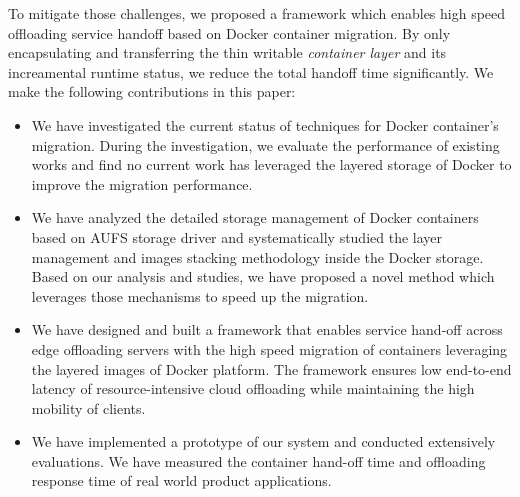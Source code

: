 %
To mitigate those challenges, we proposed a framework which enables high speed offloading service handoff based on Docker container migration. By only encapsulating and transferring the thin writable \textit{container layer} and its increamental runtime status, we reduce the total handoff time significantly.
We make the following contributions in this paper:
\begin{itemize}
    
    \item We have investigated the current status of techniques for Docker container's migration. 
    During the investigation, we evaluate the performance of existing works and find no current work has leveraged the layered storage of Docker to improve the migration performance.
     
    \item  We have analyzed the detailed storage management of Docker containers based on AUFS storage driver and systematically studied the layer management and images stacking methodology inside the Docker storage. Based on our analysis and studies, we have proposed a novel method which leverages those mechanisms to speed up the migration.
    
 
     \item We have designed and built a framework that enables service hand-off across edge offloading servers with the high speed migration of containers leveraging the layered images of Docker platform. The framework ensures low end-to-end latency of resource-intensive cloud offloading while maintaining the high mobility of clients. 
     
    \item We have implemented a prototype of our system and conducted extensively evaluations. We have measured the container hand-off time and offloading response time of real world product applications.
    
\end{itemize}

